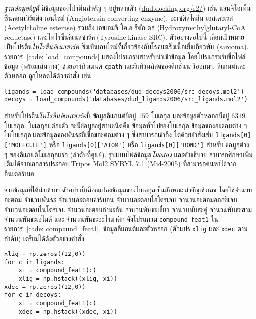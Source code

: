 \begin{Exercise}
\textit{ฐานข้อมูลดียูดี}
มีข้อมูลของโปรตีนสำคัญ ๆ อยู่หลายตัว (\url{dud.docking.org/r2/})
เช่น แอนจิโอเท็นซินคอนเวิร์ตติง เอนไซม์ (Angiotensin-converting enzyme),
อะเซติลโคลีน เอสเตอเรส (Acetylcholine esterase)
รวมถึง
เอชเอมจี โคเอ รีดักเตส (Hydroxymethylglutaryl-CoA reductase)
และไทโรซีนคิเนสซาร์ค (Tyrosine kinase SRC).
%
ตัวอย่างต่อไปนี้ เลือกเป้าหมายเป็นโปรตีน\textit{ไทโรซีนคิเนสซาร์ค}
ซึ่งเป็นเอนไซม์ทีี่เกี่ยวข้องกับโรคมะเร็งเนื้อเยื่อเกี่ยวพัน (sarcoma).
รายการ~\ref{code: load_compounds}
แสดงโปรแกรมสำหรับนำเข้าข้อมูล โดยโปรแกรมรับชื่อไฟล์ข้อมูล (พร้อมเส้นทาง) ด้วยอาร์กิวเมนต์ \verb|cpath|
และรีเทิร์นลิสต์ของดิกชันนารีออกมา.
ลิแกนต์และตัวหลอก
ถูกโหลดได้ด้วยคำสั่ง เช่น
\begin{Verbatim}[fontsize=\small]
ligands = load_compounds('databases/dud_decoys2006/src_decoys.mol2')
decoys = load_compounds('databases/dud_ligands2006/src_ligands.mol2')
\end{Verbatim}
สำหรับโปรตีน\textit{ไทโรซีนคิเนสซาร์ค}นี้
ข้อมูลลิแกนต์มีอยู่ $159$ โมเลกุล
และข้อมูลตัวหลอกมีอยู่ $6319$ โมเลกุล.
โมเลกุลแต่ละตัว จะมีข้อมูลอยู่สามชนิดคือ
ข้อมูลทั่วไปของโมเลกุล
ข้อมูลของอะตอมต่าง ๆ ในโมเลกุล
และข้อมูลของพันธะที่เชื่อมอะตอมต่าง ๆ
ซึ่งสามารถเข้าถึง ได้ด้วยคำสั่งเช่น
\verb|ligands[0]['MOLECULE']|
หรือ
\verb|ligands[0]['ATOM']|
หรือ
\verb|ligands[0]['BOND']|
สำหรับ ข้อมูลต่าง ๆ ของลิแกนต์โมเลกุลแรก (ลำดับที่ศูนย์).
รูปแบบไฟล์ข้อมูล\textit{โมลสอง} และคำอธิบาย สามารถศึกษาเพิ่มเติมได้จากเอกสารประกอบ Tripos Mol2 SYBYL 7.1 (Mid-2005) ที่สามารถค้นหาได้จากอินเตอร์เนต.



จากข้อมูลที่ได้นำเข้ามา
ตัวอย่างนี้เลือกแปลงข้อมูลของโมเลกุลเป็นลักษณะสำคัญเชิงเลข
โดยใช้จำนวนอะตอม 
จำนวนพันธะ
จำนวนอะตอมคาร์บอน
จำนวนอะตอมไฮโดรเจน
จำนวนอะตอมออกซิเจน
จำนวนอะตอมไนโตรเจน
จำนวนอะตอมกำมะถัน
จำนวนพันธะเดี่ยว
จำนวนพันธะคู่
จำนวนพันธะสาม
จำนวนพันธะเอไมด์
และ
จำนวนพันธะอะโรมาติก
ดังโปรแกรม \verb|compound_feat1|
ในรายการ~\ref{code: compound_feat1}.
ข้อมูลลิแกนต์และตัวหลอก (ตัวแปร \verb|xlig| และ \verb|xdec| ตามลำดับ)
เตรียมได้ดังตัวอย่างคำสั่ง 
\begin{Verbatim}[fontsize=\small]
xlig = np.zeros((12,0))
for c in ligands:
    xi = compound_feat1(c)
    xlig = np.hstack((xlig, xi))
xdec = np.zeros((12,0))
for c in decoys:
    xi = compound_feat1(c)
    xdec = np.hstack((xdec, xi))
\end{Verbatim}


\end{Exercise}
